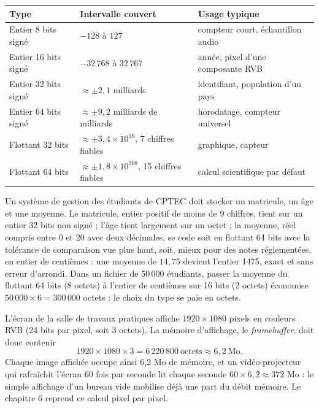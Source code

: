 \begin{center}
\small
\begin{tabular}{L{3.4cm}L{4.6cm}L{7.2cm}}
\toprule
{}\textbf{Type} & \textbf{Intervalle couvert} & \textbf{Usage typique}\\
\midrule
Entier 8 bits signé & $-128$ à $127$ & compteur court, échantillon audio\\
Entier 16 bits signé & $-32\,768$ à $32\,767$ & année, pixel d'une composante RVB\\
Entier 32 bits signé & $\approx \pm 2{,}1$ milliards & identifiant, population d'un pays\\
Entier 64 bits signé & $\approx \pm 9{,}2$ milliards de milliards & horodatage, compteur universel\\
Flottant 32 bits & $\approx \pm 3{,}4 \times 10^{38}$, 7 chiffres fiables & graphique, capteur\\
Flottant 64 bits & $\approx \pm 1{,}8 \times 10^{308}$, 15 chiffres fiables & calcul scientifique par défaut\\
\bottomrule
\end{tabular}
\label{ch4:tab:types}
\end{center}

\begin{exemple}
Un système de gestion des étudiants de CPTEC doit stocker un matricule, un âge et une moyenne. Le matricule, entier positif de moins de 9 chiffres, tient sur un entier 32 bits non signé ; l'âge tient largement sur un octet ; la moyenne, réel compris entre 0 et 20 avec deux décimales, se code soit en flottant 64 bits avec la tolérance de comparaison vue plus haut, soit, mieux pour des notes réglementées, en entier de centièmes : une moyenne de $14{,}75$ devient l'entier 1475, exact et sans erreur d'arrondi. Dans un fichier de 50\,000 étudiants, passer la moyenne du flottant 64 bits (8 octets) à l'entier de centièmes sur 16 bits (2 octets) économise $50\,000 \times 6 = 300\,000$ octets : le choix du type se paie en octets.
\end{exemple}

\begin{exemple}
L'écran de la salle de travaux pratiques affiche $1920 \times 1080$ pixels en couleurs RVB (24 bits par pixel, soit 3 octets). La mémoire d'affichage, le \emph{framebuffer}, doit donc contenir
\[
1920 \times 1080 \times 3 = 6\,220\,800\ \text{octets} \approx 6{,}2\ \text{Mo} .
\]
Chaque image affichée occupe ainsi 6,2 Mo de mémoire, et un vidéo-projecteur qui rafraîchit l'écran 60 fois par seconde lit chaque seconde $60 \times 6{,}2 \approx 372$ Mo : le simple affichage d'un bureau vide mobilise déjà une part du débit mémoire. Le chapitre 6 reprend ce calcul pixel par pixel.
\end{exemple}

